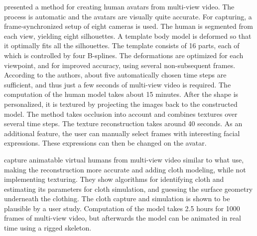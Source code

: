 \citet{ahmed2005automatic} presented a method for creating human avatars from multi-view video. The process is automatic and the avatars are visually quite accurate. For capturing, a frame-synchronized setup of eight cameras is used. The human is segmented from each view, yielding eight silhouettes. A template body model is deformed so that it optimally fits all the silhouettes. The template consists of 16 parts, each of which is controlled by four B-splines. The deformations are optimized for each viewpoint, and for improved accuracy, using several non-subsequent frames. According to the authors, about five automatically chosen time steps are sufficient, and thus just a few seconds of multi-view video is required. The computation of the human model takes about 15 minutes. After the shape is personalized, it is textured by projecting the images back to the constructed model. The method takes occlusion into account and combines textures over several time steps. The texture reconstruction takes around 40 seconds. As an additional feature, the user can manually select frames with interesting facial expressions. These expressions can then be changed on the avatar. \citep{ahmed2005automatic}

\newtopic

\citet{stoll2010video} capture animatable virtual humans from multi-view video similar to what \citet{ahmed2005automatic} use, making the reconstruction more accurate and adding cloth modeling, while not implementing texturing. They show algorithms for identifying cloth and estimating its parameters for cloth simulation, and guessing the surface geometry underneath the clothing. The cloth capture and simulation is shown to be plausible by a user study. Computation of the model takes 2.5 hours for 1000 frames of multi-view video, but afterwards the model can be animated in real time using a rigged skeleton. \citep{stoll2010video}

